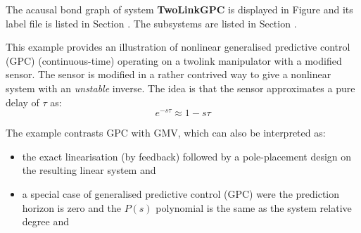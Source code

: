 

   The acausal bond graph of system \textbf{TwoLinkGPC} is
   displayed in Figure  and its label
   file is listed in Section .
   The subsystems are listed in Section .
   
   This example provides an illustration of nonlinear generalised
   predictive control (GPC) (continuous-time) operating on a twolink
   manipulator with a modified sensor.  The  sensor is modified in a
   rather contrived way to give a nonlinear system with an
   \emph{unstable} inverse. The idea is that the sensor approximates a
   pure delay of $\tau$ as:
   \begin{equation}
     e^{-s\tau} \approx 1 - s \tau
   \end{equation}
   
   The example contrasts GPC with GMV, which can also be interpreted
   as:
\begin{itemize}
\item the exact linearisation (by feedback) followed by a
  pole-placement design on the resulting linear system and
\item a special case of generalised predictive control (GPC) were the
  prediction horizon is zero and the $P(s)$ polynomial is the same as
  the system relative degree and
\end{itemize}


